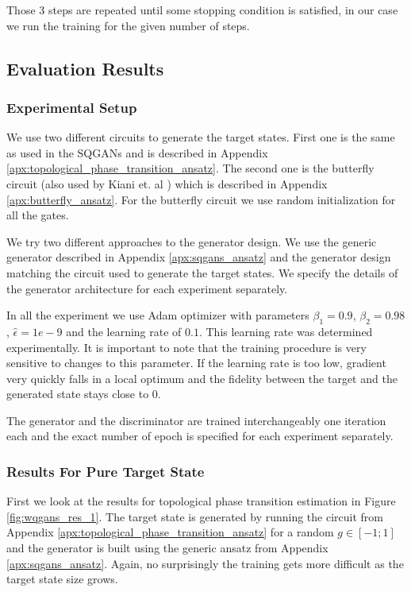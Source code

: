 Those 3 steps are repeated until some stopping condition is satisfied, in our
case we run the training for the given number of steps.

\subsection{Evaluation Results}
\subsubsection{Experimental Setup}
We use two different circuits to generate the target states. First one is the
same as used in the SQGANs and is described in Appendix
\ref{apx:topological_phase_transition_ansatz}.
The second one is the butterfly circuit (also used by Kiani et.
al \cite{kiani2021quantum}) which is described in Appendix
\ref{apx:butterfly_ansatz}. For the butterfly circuit we use random
initialization for all the gates.

We try two different approaches to the generator design. We use the generic
generator described in Appendix \ref{apx:sqgans_ansatz} and the generator
design matching the circuit used to generate the target states. We specify the
details of the generator architecture for each experiment separately.

In all the experiment we use Adam optimizer \cite{kingma2017adam} with
parameters $\beta_1 = 0.9$, $\beta_2=0.98$, $\hat{\epsilon} = 1e-9$ and the
learning rate of $0.1$. This learning rate was determined experimentally. It
is important to note that the training procedure is very sensitive to changes to
this parameter. If the learning rate is too low, gradient very quickly falls in
a local optimum and the fidelity between the target and the generated state stays close to $0$.

The generator and the discriminator are trained interchangeably one iteration each
and the exact number of epoch is specified for each experiment separately.
\subsubsection{Results For Pure Target State}
First we look at the results for topological phase transition estimation in
Figure \ref{fig:wqgans_res_1}. The target state is generated by running the circuit from Appendix
\ref{apx:topological_phase_transition_ansatz} for a random $g \in [-1; 1]$ and the
generator is built using the generic ansatz from Appendix
\ref{apx:sqgans_ansatz}. Again, no surprisingly the training gets more difficult
as the target state size grows.

